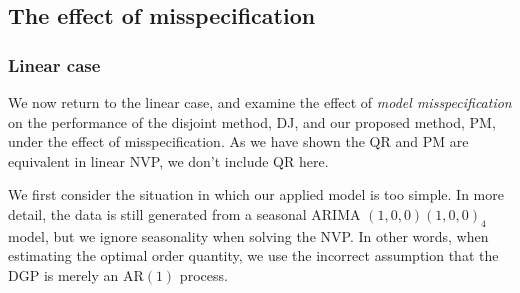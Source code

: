 \documentclass{article}
\begin{document}
\subsection{The effect of misspecification} \label{sub:exp3}
\subsubsection{Linear case}

We now return to the linear case, and examine the effect of
\emph{model misspecification} on the performance of the disjoint method,
DJ, and our proposed method, PM, under the effect of misspecification. As we have shown the QR and PM are equivalent in linear NVP, we don't include QR here.

We first consider the situation in which our applied model is too simple.
In more detail, the data is still generated from a seasonal ARIMA $(1,0,0)(1,0,0)_4$ model, but we ignore seasonality when solving the NVP. In other words, when estimating the optimal order quantity, we use the incorrect assumption that the DGP is merely an AR$(1)$ process. %
\end{document}
